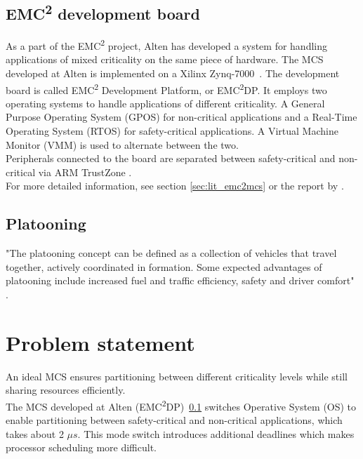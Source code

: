 \subsection{EMC\textsuperscript{2} development board}
\label{sec:mces}
As a part of the EMC\textsuperscript{2} project, Alten has developed a system for handling applications of mixed criticality on the same piece of hardware. The MCS developed at Alten is implemented on a Xilinx Zynq-7000~\cite{website:xilinx}. The development board is called EMC\textsuperscript{2} Development Platform, or EMC\textsuperscript{2}DP. It employs two operating systems to handle applications of different criticality. A General Purpose Operating System (GPOS) for non-critical applications and a Real-Time Operating System (RTOS) for safety-critical applications. A Virtual Machine Monitor (VMM) is used to alternate between the two.\\ %

Peripherals connected to the board are separated between safety-critical and non-critical via ARM TrustZone \cite{website:ARM}.\\

For more detailed information, see section \ref{sec:lit_emc2mcs} or the report by \cite{zaki2016}.

\subsection{Platooning}
\label{sec:platooning}
"The platooning concept can be defined as a collection of  vehicles that travel together, actively coordinated in formation. Some expected advantages of platooning include increased fuel and traffic efficiency, safety and driver comfort" \cite{bergenhem}.

\section{Problem statement}
\label{sec:problem}
An ideal MCS ensures partitioning between different criticality levels while still sharing resources efficiently.\\ %

The MCS developed at Alten (EMC\textsuperscript{2}DP)~\ref{sec:mces} switches Operative System (OS) to enable partitioning between safety-critical and non-critical applications, which takes about 2 $\mu s$. This mode switch introduces additional deadlines which makes processor scheduling more difficult.\\ %

